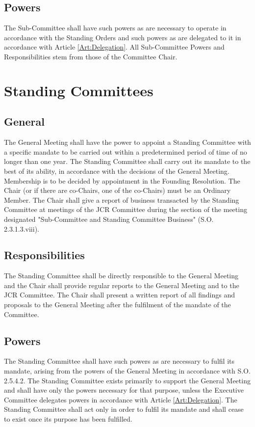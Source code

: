 \subsection{Powers}
\npara The Sub-Committee shall have such powers as are necessary to operate in accordance with the Standing Orders and such powers as are delegated to it in accordance with Article \ref{Art:Delegation}.
All Sub-Committee Powers and Responsibilities stem from those of the Committee Chair.
\section{Standing Committees}
\subsection{General}
\npara The General Meeting shall have the power to appoint a Standing Committee with a specific mandate to be carried out within a predetermined period of time of no longer than one year. 
\npara The Standing Committee shall carry out its mandate to the best of its ability, in accordance with the decisions of the General Meeting.
\npara Membership is to be decided by appointment in the Founding Resolution.  The Chair (or if there are co-Chairs, one of the co-Chairs) must be an Ordinary Member.
\npara The Chair shall give a report of business transacted by the Standing Committee at meetings of the JCR Committee during the section of the meeting designated "Sub-Committee and Standing Committee Business" (S.O. 2.3.1.3.viii).
\subsection{Responsibilities}
\npara The Standing Committee shall be directly responsible to the General Meeting and the Chair shall provide regular reports to the General Meeting and to the JCR Committee.
\npara The Chair shall present a written report of all findings and proposals to the General Meeting after the fulfilment of the mandate of the Committee.
\subsection{Powers}
\npara The Standing Committee shall have such powers as are necessary to fulfil its mandate, arising from the powers of the General Meeting in accordance with S.O. 2.5.4.2.
\npara The Standing Committee exists primarily to support the General Meeting and shall have only the powers necessary for that purpose, unless the Executive Committee delegates powers in accordance with Article \ref{Art:Delegation}.
\npara The Standing Committee shall act only in order to fulfil its mandate and shall cease to exist once its purpose has been fulfilled.
